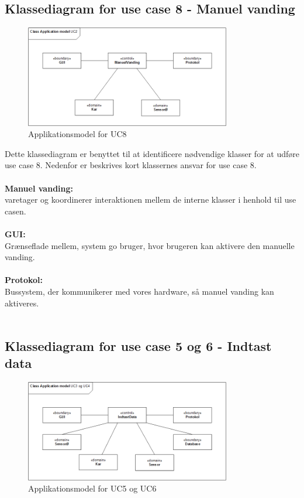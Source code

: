 \subsection{Klassediagram for use case 8 - Manuel vanding}
\begin{figure}[H]
    \centering
    \includegraphics[width=0.8\textwidth]{Systemarkitektur/KlasseDiagrammer/8_ManuelVanding.PNG}
    \caption{Applikationsmodel for UC8}
    \label{fig:app_uc8}
\end{figure}

Dette klassediagram er benyttet til at identificere nødvendige klasser for at udføre use case 8.
Nedenfor er beskrives kort klassernes ansvar for use case 8.
\\\\
\textbf{Manuel vanding:}\\
varetager og koordinerer interaktionen mellem de interne klasser i henhold til use casen.
\\\\
\textbf{GUI:}\\
Grænseflade mellem, system go bruger, hvor brugeren kan aktivere den manuelle vanding. 
\\\\
\textbf{Protokol:}\\
Bussystem, der kommunikerer med vores hardware, så manuel vanding kan aktiveres.
\\\\

\subsection{Klassediagram for use case 5 og 6 - Indtast data}

\begin{figure}[H]
    \centering
    \includegraphics[width=0.8\textwidth]{Systemarkitektur/KlasseDiagrammer/5+6_IndtastData.PNG}
    \caption{Applikationsmodel for UC5 og UC6}
    \label{fig:app_uc56}
\end{figure}

